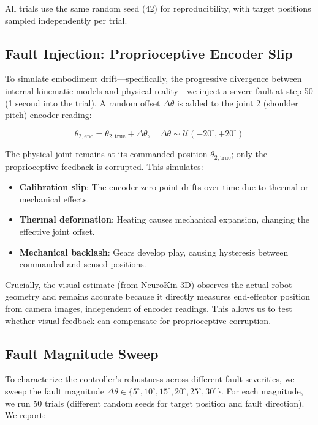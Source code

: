 \documentclass[12pt,a4paper,oneside]{report}
\begin{document}
All trials use the same random seed (42) for reproducibility, with target positions sampled independently per trial.

\subsection{Fault Injection: Proprioceptive Encoder Slip}

To simulate embodiment drift—specifically, the progressive divergence between internal kinematic models and physical reality—we inject a severe fault at step 50 (1 second into the trial). A random offset $\Delta \theta$ is added to the joint 2 (shoulder pitch) encoder reading:

\begin{equation}
\theta_{2,\text{enc}} = \theta_{2,\text{true}} + \Delta \theta, \quad \Delta \theta \sim \mathcal{U}(-20^\circ, +20^\circ)
\end{equation}

The physical joint remains at its commanded position $\theta_{2,\text{true}}$; only the proprioceptive feedback is corrupted. This simulates:

\begin{itemize}
    \item \textbf{Calibration slip}: The encoder zero-point drifts over time due to thermal or mechanical effects.
    \item \textbf{Thermal deformation}: Heating causes mechanical expansion, changing the effective joint offset.
    \item \textbf{Mechanical backlash}: Gears develop play, causing hysteresis between commanded and sensed positions.
\end{itemize}

Crucially, the visual estimate (from NeuroKin-3D) observes the actual robot geometry and remains accurate because it directly measures end-effector position from camera images, independent of encoder readings. This allows us to test whether visual feedback can compensate for proprioceptive corruption.

\subsection{Fault Magnitude Sweep}

To characterize the controller's robustness across different fault severities, we sweep the fault magnitude $\Delta \theta \in \{5^\circ, 10^\circ, 15^\circ, 20^\circ, 25^\circ, 30^\circ\}$. For each magnitude, we run 50 trials (different random seeds for target position and fault direction). We report:
\end{document}
